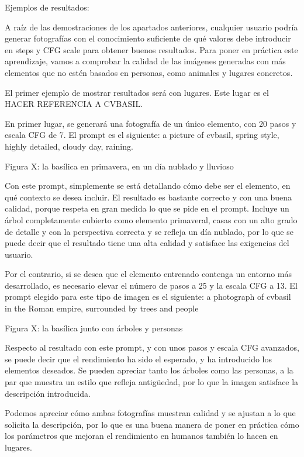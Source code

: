 Ejemplos de resultados:

A raíz de las demostraciones de los apartados anteriores, cualquier usuario podría generar fotografías con el conocimiento suficiente de qué valores debe introducir en steps y CFG scale para obtener buenos resultados. Para poner en práctica este aprendizaje, vamos a comprobar la calidad de las imágenes generadas con más elementos que no estén basados en personas, como animales y lugares concretos.

El primer ejemplo de mostrar resultados será con lugares. Este lugar es el HACER REFERENCIA A CVBASIL. 

En primer lugar, se generará una fotografía de un único elemento, con 20 pasos y escala CFG de 7. El prompt es el siguiente: a picture of cvbasil, spring style, highly detailed, cloudy day, raining.


Figura X: la basílica en primavera, en un día nublado y lluvioso

Con este prompt, simplemente se está detallando cómo debe ser el elemento, en qué contexto se desea incluir. El resultado es bastante correcto y con una buena calidad, porque respeta en gran medida lo que se pide en el prompt. Incluye un árbol completamente cubierto como elemento primaveral, casas con un alto grado de detalle y con la perspectiva correcta y se refleja un día nublado, por lo que se puede decir que el resultado tiene una alta calidad y satisface las exigencias del usuario.

Por el contrario, si se desea que el elemento entrenado contenga un entorno más desarrollado, es necesario elevar el número de pasos a 25 y la escala CFG a 13. 
El prompt elegido para este tipo de imagen es el siguiente: a photograph of cvbasil in the Roman empire, surrounded by trees and people


Figura X: la basílica junto con árboles y personas

Respecto al resultado con este prompt, y con unos pasos y escala CFG avanzados, se puede decir que el rendimiento ha sido el esperado, y ha introducido los elementos deseados. Se pueden apreciar tanto los árboles como las personas, a la par que muestra un estilo que refleja antigüedad, por lo que la imagen satisface la descripción introducida.

Podemos apreciar cómo ambas fotografías muestran calidad y se ajustan a lo que solicita la descripción, por lo que es una buena manera de poner en práctica cómo los parámetros que mejoran el rendimiento en humanos también lo hacen en lugares.

